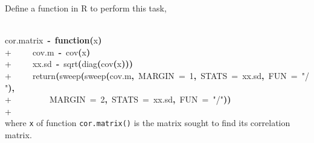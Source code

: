 \documentclass{article}
\newcommand{\hlnumber}[1]{\textcolor[rgb]{0.0823529411764706,0.0784313725490196,0.709803921568627}{#1}}%
\newcommand{\hlfunctioncall}[1]{\textcolor[rgb]{1,0,0}{#1}}%
\newcommand{\hlstring}[1]{\textcolor[rgb]{0.6,0.6,1}{#1}}%
\newcommand{\hlkeyword}[1]{\textcolor[rgb]{0,0,0}{\textbf{#1}}}%
\newcommand{\hlargument}[1]{\textcolor[rgb]{0.694117647058824,0.247058823529412,0.0196078431372549}{#1}}%
\newcommand{\hlformalargs}[1]{\textcolor[rgb]{0.0705882352941176,0.713725490196078,0.0705882352941176}{#1}}%
\newcommand{\hlassignement}[1]{\textcolor[rgb]{0.215686274509804,0.215686274509804,0.384313725490196}{\textbf{#1}}}%
\newcommand{\hlsymbol}[1]{\textcolor[rgb]{0,0,0}{#1}}%
\newcommand{\hlprompt}[1]{\textcolor[rgb]{0,0,0}{#1}}%
\newcommand{\hlstd}[1]{\textcolor[rgb]{0,0,0}{#1}}%
\newenvironment{Houtput}{\raggedright}{%
%
}
\begin{document}
    Define a function in R to perform this task,
\begin{Houtput}
\hspace*{\fill}\\
\hlstd{}\ttfamily\noindent
\hlprompt{\usebox{\hlnormalsizeboxgreaterthan}{\ }}\hlsymbol{cor.matrix}{\ }\hlassignement{\usebox{\hlnormalsizeboxlessthan}-}{\ }\hlkeyword{function}\hlkeyword{(}\hlformalargs{x}\hlkeyword{)}{\ }\hlkeyword{\usebox{\hlnormalsizeboxopenbrace}}\hspace*{\fill}\\
\hlstd{}\hlprompt{+{\ }}{\ }{\ }{\ }{\ }\hlsymbol{cov.m}{\ }\hlassignement{\usebox{\hlnormalsizeboxlessthan}-}{\ }\hlfunctioncall{cov}\hlkeyword{(}\hlsymbol{x}\hlkeyword{)}\hspace*{\fill}\\
\hlstd{}\hlprompt{+{\ }}{\ }{\ }{\ }{\ }\hlsymbol{xx.sd}{\ }\hlassignement{\usebox{\hlnormalsizeboxlessthan}-}{\ }\hlfunctioncall{sqrt}\hlkeyword{(}\hlfunctioncall{diag}\hlkeyword{(}\hlfunctioncall{cov}\hlkeyword{(}\hlsymbol{x}\hlkeyword{)}\hlkeyword{)}\hlkeyword{)}\hspace*{\fill}\\
\hlstd{}\hlprompt{+{\ }}{\ }{\ }{\ }{\ }\hlfunctioncall{return}\hlkeyword{(}\hlfunctioncall{sweep}\hlkeyword{(}\hlfunctioncall{sweep}\hlkeyword{(}\hlsymbol{cov.m}\hlkeyword{,}{\ }\hlargument{MARGIN}{\ }\hlargument{=}{\ }\hlnumber{1}\hlkeyword{,}{\ }\hlargument{STATS}{\ }\hlargument{=}{\ }\hlsymbol{xx.sd}\hlkeyword{,}{\ }\hlargument{FUN}{\ }\hlargument{=}{\ }\hlstring{"/"}\hlkeyword{)}\hlkeyword{,}\hspace*{\fill}\\
\hlstd{}\hlprompt{+{\ }}{\ }{\ }{\ }{\ }{\ }{\ }{\ }{\ }\hlargument{MARGIN}{\ }\hlargument{=}{\ }\hlnumber{2}\hlkeyword{,}{\ }\hlargument{STATS}{\ }\hlargument{=}{\ }\hlsymbol{xx.sd}\hlkeyword{,}{\ }\hlargument{FUN}{\ }\hlargument{=}{\ }\hlstring{"/"}\hlkeyword{)}\hlkeyword{)}\hspace*{\fill}\\
\hlstd{}\hlprompt{+{\ }}\hlkeyword{\usebox{\hlnormalsizeboxclosebrace}}\mbox{}
\normalfont
\hspace*{\fill}\\
\hlstd{}
\end{Houtput}
    where \verb=x= of function \verb=cor.matrix()= is the matrix sought to find its correlation matrix.
\end{document}

